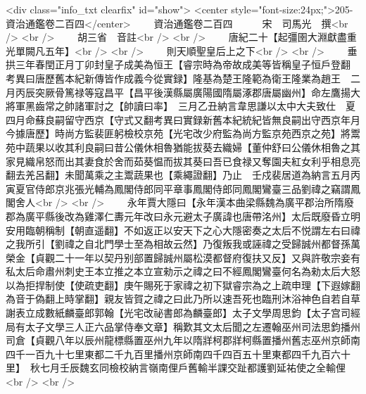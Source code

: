 <div class="info_txt clearfix" id="show">
<center style="font-size:24px;">205-資治通鑑卷二百四</center>
  　　資治通鑑卷二百四　　　宋　司馬光　撰<br />
<br />
　　胡三省　音註<br />
<br />
　　唐紀二十【起彊圉大淵獻盡重光單闕凡五年】<br />
<br />
　　則天順聖皇后上之下<br />
<br />
　　垂拱三年春閏正月丁卯封皇子成美為恒王【睿宗時為帝故成美等皆稱皇子恒戶登翻　考異曰唐歷舊本紀新傳皆作成義今從實録】隆基為楚王隆範為衛王隆業為趙王　二月丙辰突厥骨篤禄等寇昌平【昌平後漢縣屬廣陽國隋屬涿郡唐屬幽州】命左鷹揚大將軍黑齒常之帥諸軍討之【帥讀曰率】　三月乙丑納言韋思謙以太中大夫致仕　夏四月命蘇良嗣留守西京【守式又翻考異曰實録新舊本紀統紀皆無良嗣出守西京年月今據唐歷】時尚方監裴匪躬檢校京苑【光宅改少府監為尚方監京苑西京之苑】將鬻苑中蔬果以收其利良嗣曰昔公儀休相魯猶能拔葵去織婦【董仲舒曰公儀休相魯之其家見織帛怒而出其妻食於舍而茹葵愠而拔其葵曰吾已食禄又奪園夫紅女利乎相息亮翻去羌呂翻】未聞萬乘之主鬻蔬果也【乘繩證翻】乃止　壬戍裴居道為納言五月丙寅夏官侍郎京兆張光輔為鳳閣侍郎同平章事鳳閣侍郎同鳳閣鸞臺三品劉禕之竊謂鳳閣舍人<br />
<br />
　　永年賈大隱曰【永年漢本曲梁縣魏為廣平郡治所隋廢郡為廣平縣後改為雞澤仁夀元年改曰永元避太子廣諱也唐帶洺州】太后既廢昏立明安用臨朝稱制【朝直遥翻】不如返正以安天下之心大隱密奏之太后不悦謂左右曰禕之我所引【劉禕之自北門學士至為相故云然】乃復叛我或誣禕之受歸誠州都督孫萬榮金【貞觀二十一年以契丹别部置歸誠州屬松漠都督府復扶又反】又與許敬宗妾有私太后命肅州刺史王本立推之本立宣勑示之禕之曰不經鳳閣鸞臺何名為勑太后大怒以為拒捍制使【使疏吏翻】庚午賜死于家禕之初下獄睿宗為之上疏申理【下遐嫁翻為音于偽翻上時掌翻】親友皆賀之禕之曰此乃所以速吾死也臨刑沐浴神色自若自草謝表立成數紙麟臺郎郭翰【光宅改祕書郎為麟臺郎】太子文學周思鈞【太子宫司經局有太子文學三人正六品掌侍奉文章】稱歎其文太后聞之左遷翰巫州司法思鈞播州司倉【貞觀八年以辰州龍標縣置巫州九年以隋牂柯郡牂柯縣置播州舊志巫州京師南四千一百九十七里東都二千九百里播州京師南四千四百五十里東都四千九百六十里】　秋七月壬辰魏玄同檢校納言嶺南俚戶舊輸半課交趾都護劉延祐使之全輸俚<br />
<br />

